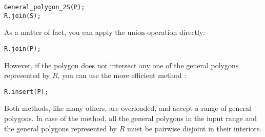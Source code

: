 \begin{alltt}
General_polygon_2 S(P);
R.join(S);
\end{alltt}

As a matter of fact, you can apply the union operation directly:

\begin{alltt}
R.join(P);
\end{alltt}

However, if the polygon does not intersect any one of the general
polygons represented by $R$, you can use the more efficient method
:

\begin{alltt}
R.insert(P);
\end{alltt}

Both methods, like many others, are overloaded, and accept a range of
general polygons. In case of the  method, all the general
polygons in the input range and the general polygons represented by
$R$ must be pairwise disjoint in their interiors.

